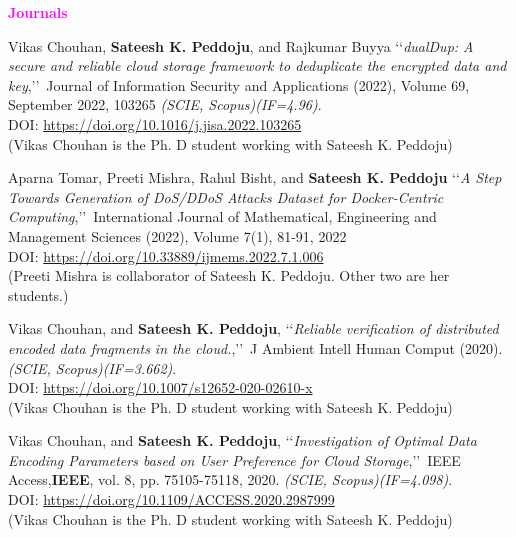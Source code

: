 \begin{flushleft}
	{\textbf{\textcolor{magenta}{Journals}}}
\end{flushleft}

\begin{etaremune}
	\item
	Vikas Chouhan, \textbf{Sateesh K. Peddoju}, and Rajkumar Buyya \lq\lq \textit{dualDup: A secure and reliable cloud storage framework to deduplicate the encrypted data and key},\rq\rq\, Journal of Information Security and Applications (2022), Volume 69, September 2022, 103265 \emph{(SCIE, Scopus)(IF=4.96)}. \\DOI: \url{https://doi.org/10.1016/j.jisa.2022.103265}  \\(Vikas Chouhan is the Ph. D student working with Sateesh K. Peddoju)

 	\item
  Aparna Tomar, Preeti Mishra, Rahul Bisht, and \textbf{Sateesh K. Peddoju} \lq\lq \textit{A Step Towards Generation of DoS/DDoS Attacks Dataset for Docker-Centric Computing},\rq\rq\, International Journal of Mathematical, Engineering and Management Sciences (2022), Volume 7(1), 81-91, 2022 \\DOI: \url{https://doi.org/10.33889/ijmems.2022.7.1.006}  \\(Preeti Mishra is collaborator of Sateesh K. Peddoju. Other two are her students.)
 
 \item
	Vikas Chouhan, and \textbf{Sateesh K. Peddoju}, \lq\lq \textit{Reliable verification of distributed encoded data fragments in the cloud.},\rq\rq\, J Ambient Intell Human Comput (2020). \emph{(SCIE, Scopus)(IF=3.662)}. \\DOI: \url{https://doi.org/10.1007/s12652-020-02610-x}  \\(Vikas Chouhan is the Ph. D student working with Sateesh K. Peddoju)
	
	\item
	Vikas Chouhan, and \textbf{Sateesh K. Peddoju}, \lq\lq \textit{Investigation of Optimal Data Encoding Parameters based on User Preference for Cloud Storage},\rq\rq\, IEEE Access,\textbf{IEEE}, vol. 8, pp. 75105-75118, 2020. \emph{(SCIE, Scopus)(IF=4.098)}. \\DOI: \url{https://doi.org/10.1109/ACCESS.2020.2987999} \\(Vikas Chouhan is the Ph. D student working with Sateesh K. Peddoju)
	

\end{etaremune}
